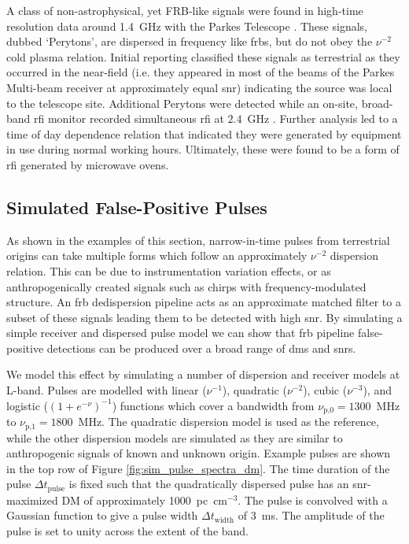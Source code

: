 \documentclass[a4paper,fleqn,usenatbib]{mnras}
\begin{document}
A class of non-astrophysical, yet FRB-like signals were found in high-time
resolution data around 1.4~GHz with the Parkes Telescope
\citep{2011ApJ...727...18B}. These signals, dubbed `Perytons', are dispersed in
frequency like \glspl{frb}, but do not obey the $\nu^{-2}$ cold plasma relation.
Initial reporting classified these signals as terrestrial as they occurred in the
near-field (i.e. they appeared in most of the beams of the Parkes Multi-beam
receiver at approximately equal \gls{snr}) indicating the source was local to
the telescope site.  Additional Perytons were detected while an on-site,
broad-band \gls{rfi} monitor recorded simultaneous \gls{rfi} at $2.4$~GHz
\citep{2015MNRAS.451.3933P}. Further analysis led to a time of day dependence
relation that indicated they were generated by equipment in use during normal
working hours.  Ultimately, these were found to be a form of \gls{rfi} generated
by microwave ovens.

\subsection{Simulated False-Positive Pulses}
\label{sec:sim_pulses}

As shown in the examples of this section, narrow-in-time pulses from terrestrial
origins can take multiple forms which follow an approximately $\nu^{-2}$
dispersion relation. This can be due to instrumentation variation effects, or as
anthropogenically created signals such as chirps with frequency-modulated
structure.  An \gls{frb} dedispersion pipeline acts as an approximate matched
filter to a subset of these signals leading them to be detected with high
\gls{snr}. By simulating a simple receiver and dispersed pulse model we can show
that \gls{frb} pipeline false-positive detections can be produced over a broad
range of \glspl{dm} and \glspl{snr}.

We model this effect by simulating a number of dispersion and receiver models at
L-band.  Pulses are modelled with linear ($\nu^{-1}$), quadratic ($\nu^{-2}$),
cubic ($\nu^{-3}$), and logistic ($(1+e^{-\nu})^{-1}$) functions which
cover a bandwidth from $\nu_{\textrm{p,0}} = 1300$~MHz to $\nu_{\textrm{p,1}} =
1800$~MHz.  The quadratic dispersion model is used as the reference, while the other
dispersion models are simulated as they are similar to anthropogenic signals of
known and unknown origin.  Example pulses are shown in the top row of Figure
\ref{fig:sim_pulse_spectra_dm}. The time duration of the pulse $\Delta
t_{\textrm{pulse}}$ is fixed such that the quadratically dispersed pulse has an
\gls{snr}-maximized DM of approximately 1000~pc~cm$^{-3}$. The pulse is
convolved with a Gaussian function to give a pulse width $\Delta
t_{\textrm{width}}$ of 3~ms. The amplitude of the pulse is set to unity across
the extent of the band.
\end{document}
